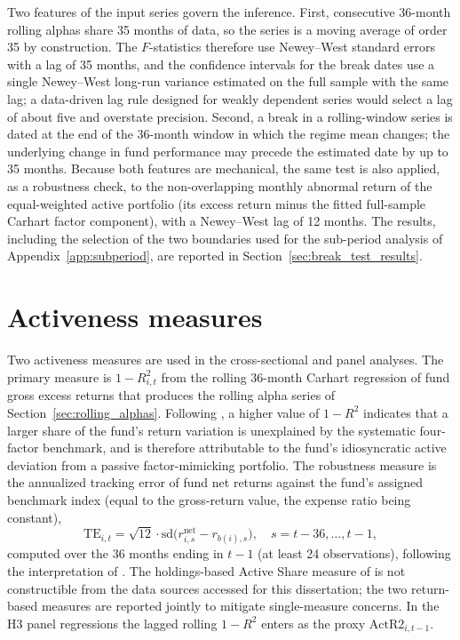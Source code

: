 \documentclass[12pt, oneside]{report}
\begin{document}
Two features of the input series govern the inference. First,
consecutive 36-month rolling alphas share 35 months of data, so the series
is a moving average of order 35 by construction. The $F$-statistics therefore
use Newey--West standard errors with a lag of 35 months, and the
confidence intervals for the break dates use a single Newey--West
long-run variance estimated on the full sample with the same lag; a data-driven lag rule designed
for weakly dependent series would select a lag of about five and
overstate precision. Second, a break in a rolling-window series is dated
at the end of the 36-month window in which the regime mean
changes; the underlying change in fund performance may precede the
estimated date by up to 35 months. Because both features are mechanical,
the same test is also applied, as a robustness check, to the
non-overlapping monthly abnormal return of the equal-weighted
active portfolio (its excess return minus the fitted full-sample Carhart
factor component), with a Newey--West lag of 12 months. The results,
including the selection of the two boundaries used for the sub-period
analysis of Appendix~\ref{app:subperiod}, are reported in
Section~\ref{sec:break_test_results}.

\section{Activeness measures}
\label{sec:activeness_methodology}

\noindent Two activeness measures are used in the cross-sectional and
panel analyses. The primary measure is $1 - R^2_{i,t}$ from the rolling
36-month Carhart regression of fund gross excess returns that produces
the rolling alpha series of Section~\ref{sec:rolling_alphas}. Following
\textcite{AmihudGoyenko2013}, a higher value of $1 - R^2$ indicates
that a larger share of the fund's return variation is unexplained by
the systematic four-factor benchmark, and is therefore attributable
to the fund's idiosyncratic active deviation from a passive
factor-mimicking portfolio. The robustness measure is the annualized
tracking error of fund net returns against the fund's assigned
benchmark index (equal to the gross-return value, the expense ratio being
constant),
\begin{equation}
\label{eq:tracking_error}
\text{TE}_{i,t} = \sqrt{12} \cdot \text{sd}\bigl(r^{\text{net}}_{i,s} - r_{b(i),s}\bigr),
\quad s = t-36, \ldots, t-1,
\end{equation}
computed over the 36 months ending in $t-1$ (at least 24 observations),
following the interpretation of \textcite{CremersPetajisto2009}. The
holdings-based Active Share measure of \textcite{CremersPetajisto2009}
is not constructible from the data sources accessed for this
dissertation; the two return-based measures are reported jointly to
mitigate single-measure concerns. In the H3 panel regressions the
lagged rolling $1 - R^2$ enters as the proxy $\text{ActR2}_{i,t-1}$.
\end{document}
